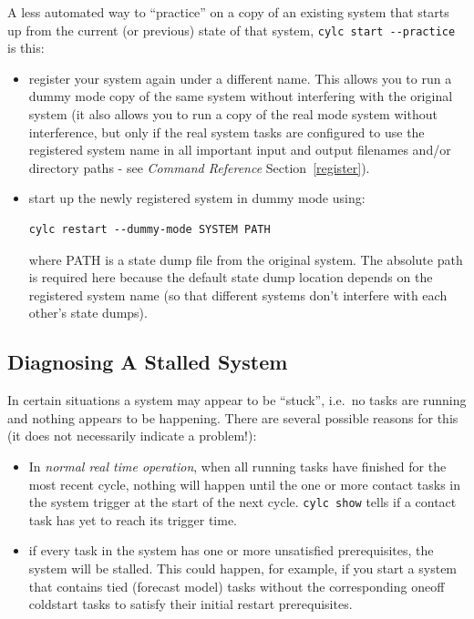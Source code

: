 \documentclass[11pt,a4paper]{article}
\begin{document}
A less automated way to ``practice'' on a copy of an existing system
that starts up from the current (or previous) state of that system, 
\lstinline=cylc start --practice= is this:

\begin{itemize}
    \item register your system again under a different name. This allows
        you to run a dummy mode copy of the same system without
        interfering with the original system (it also allows you to run
        a copy of the real mode system without interference, but only if
        the real system tasks are configured to use the registered
        system name in all important input and output filenames and/or
        directory paths - see {\em Command Reference} Section~\ref{register}).

    \item start up the newly registered system in dummy mode using:
        \begin{lstlisting}
cylc restart --dummy-mode SYSTEM PATH
        \end{lstlisting}
        where PATH is a state dump file from the original system. The
        absolute path is required here because the default state
        dump location depends on the registered system name (so that
        different systems don't interfere with each other's state
        dumps).

\end{itemize}

\subsection{Diagnosing A Stalled System}
\label{DiagnosingAStalledSystem}

In certain situations a system may appear to be ``stuck'', i.e.\ no
tasks are running and nothing appears to be happening. There are several 
possible reasons for this (it does not necessarily indicate a problem!):

\begin{itemize}
    \item In {\em normal real time operation}, when all running tasks
        have finished for the most recent cycle, nothing will happen
        until the one or more contact tasks in the system trigger at the
        start of the next cycle. \lstinline=cylc show= tells if a
        contact task has yet to reach its trigger time.

    \item if every task in the system has one or more unsatisfied
        prerequisites, the system will be stalled. This could happen,
        for example, if you start a system that contains tied (forecast
        model) tasks without the corresponding oneoff coldstart tasks to
        satisfy their initial restart prerequisites.

\end{itemize}
\end{document}
